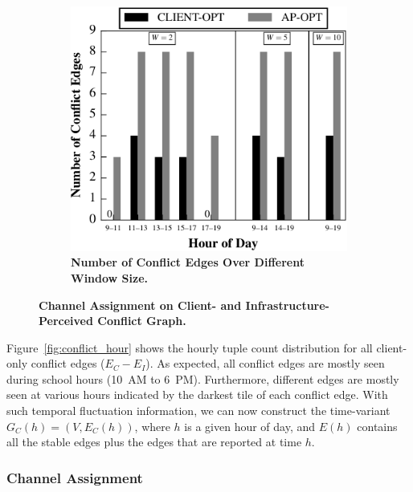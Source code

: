 \begin{figure}[t]
\begin{minipage}[b]{0.65\textwidth}
\begin{subfigure}[t]{0.49\textwidth}
      \label{fig:channel}
    \end{subfigure}\hspace*{0.02\textwidth}%
    \begin{subfigure}[t]{0.49\textwidth}
      \includegraphics[width=\textwidth]{./figures/DavisConflictEdgeMultiHour.pdf}
      \caption{\textbf{Number of Conflict Edges Over Different Window Size.}}
      \label{fig:window}
    \end{subfigure}
    \caption{\textbf{Channel Assignment on Client- and Infrastructure-Perceived
    Conflict Graph.}}
  \end{minipage}
  \vspace*{\aftercaptiongap}
\end{figure}



Figure~\ref{fig:conflict_hour} shows the hourly tuple count distribution for
all client-only conflict edges ($E_C-E_I$). As expected, all conflict edges
are mostly seen during school hours (10~AM to 6~PM). Furthermore, different
edges are mostly seen at various hours indicated by the darkest tile of each
conflict edge. With such temporal fluctuation information, we can now
construct the time-variant $G_C(h)=(V, E_C(h))$, where $h$ is a given hour of
day, and $E(h)$ contains all the stable edges plus the edges that are
reported at time $h$.


\subsubsection{Channel Assignment}

